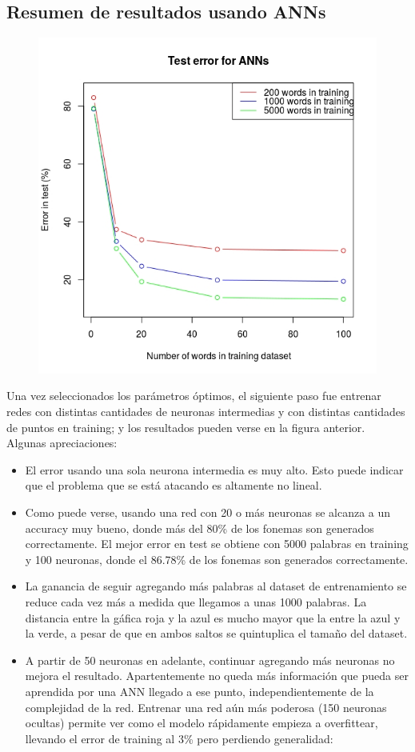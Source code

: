 \documentclass[paper=a4, fontsize=11pt]{scrartcl} %
\numberwithin{equation}{section} %
\numberwithin{figure}{section} %
\numberwithin{table}{section} %
\begin{document}
\subsection{Resumen de resultados usando ANNs}

\begin{figure}[h!]
\centering
\includegraphics[width=112mm]{imgs/annresults.jpg}
\end{figure}

Una vez seleccionados los parámetros óptimos, el siguiente paso fue entrenar redes con distintas cantidades de neuronas intermedias y con distintas cantidades de puntos en training; y los resultados pueden verse en la figura anterior. \\

Algunas apreciaciones:

\begin{itemize}
\item El error usando una sola neurona intermedia es muy alto. Esto puede indicar que el problema que se está atacando es altamente no lineal.
\item Como puede verse, usando una red con 20 o más neuronas se alcanza a un accuracy muy bueno, donde más del 80\% de los fonemas son generados correctamente. El mejor error en test se obtiene con 5000 palabras en training y 100 neuronas, donde el 86.78\% de los fonemas son generados correctamente.
\item La ganancia de seguir agregando más palabras al dataset de entrenamiento se reduce cada vez más a medida que llegamos a unas 1000 palabras. La distancia entre la gáfica roja y la azul es mucho mayor que la entre la azul y la verde, a pesar de que en ambos saltos se quintuplica el tamaño del dataset.
\item A partir de 50 neuronas en adelante, continuar agregando más neuronas no mejora el resultado. Apartentemente no queda más información que pueda ser aprendida por una ANN llegado a ese punto, independientemente de la complejidad de la red. Entrenar una red aún más poderosa (150 neuronas ocultas) permite ver como el modelo rápidamente empieza a overfittear, llevando el error de training al 3\% pero perdiendo generalidad:
\end{itemize}
\end{document}

